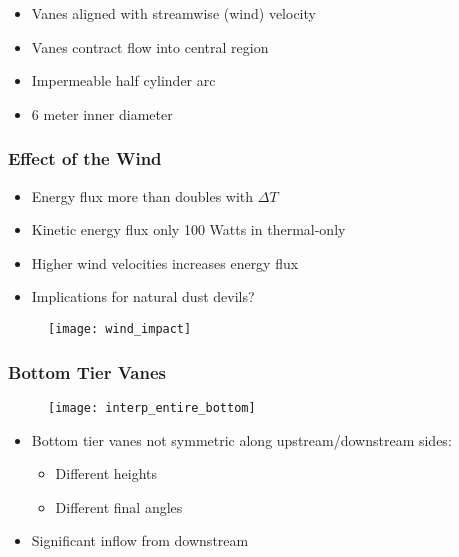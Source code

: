 \documentclass[mathserif]{beamer}
\begin{document}
\begin{frame}
 \begin{block}{}
  \begin{itemize}
   \item Vanes aligned with streamwise (wind) velocity
   \item Vanes contract flow into central region
   \item Impermeable half cylinder arc
   \item 6 meter inner diameter
  \end{itemize}
 \end{block}
\end{frame}

%
%
%
\begin{frame}
 \frametitle{Effect of the Wind}

  \begin{itemize}
    \item Energy flux more than doubles with $\Delta T$
    \item Kinetic energy flux only 100 Watts in thermal-only
    \item Higher wind velocities increases energy flux
    \item Implications for natural dust devils? 
  \end{itemize}

 \begin{figure}[htb]
  \centering
  \texttt{[image: wind\_impact]}
 \end{figure}
 
\end{frame}

%
%
%
\begin{frame}
 \frametitle{Bottom Tier Vanes}
    \begin{figure}[htb]
     \centering
     \texttt{[image: interp\_entire\_bottom]}
    \end{figure}
 
 \begin{block}{}
  \begin{itemize}
   \item Bottom tier vanes not symmetric along upstream/downstream
	 sides:
	 \begin{itemize}
	  \item Different heights
	  \item Different final angles
	 \end{itemize}
   \item Significant inflow from downstream
  \end{itemize}
 \end{block}
\end{frame}
\end{document}
